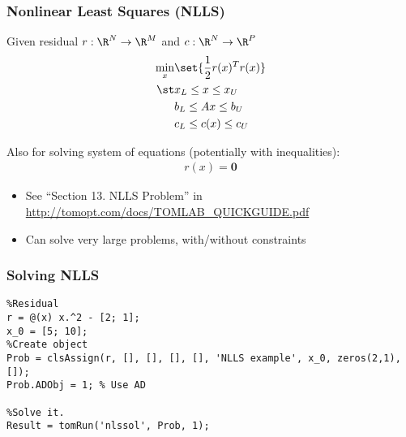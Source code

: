 \documentclass[nofootline]{etk-presentation}
\begin{document}
\begin{frame}[fragile]	\frametitle{Nonlinear Least Squares (NLLS)}
	Given residual $r : \R^N \to \R^M$ and $c : \R^N \to \R^P$
	\begin{align*}
		\min_x &\set{\frac{1}{2}r(x)^T r(x)}\\
		\st & x_L \leq x \leq x_U\\
		& b_L \leq A x \leq b_U\\
		& c_L \leq c(x) \leq c_U
	\end{align*}
	
	Also for solving system of equations (potentially with inequalities):
	\begin{align*}
		r(x) = \mathbf{0}
	\end{align*}
	\begin{itemize}
		\item See ``Section 13. NLLS Problem'' in \url{http://tomopt.com/docs/TOMLAB_QUICKGUIDE.pdf}
		\item Can solve very large problems, with/without constraints
	\end{itemize}
\end{frame}

\begin{frame}[fragile]	\frametitle{Solving NLLS}
	\begin{verbatim}
%Residual
r = @(x) x.^2 - [2; 1];	
x_0 = [5; 10];
%Create object
Prob = clsAssign(r, [], [], [], [], 'NLLS example', x_0, zeros(2,1),[]);
Prob.ADObj = 1; % Use AD

%Solve it.
Result = tomRun('nlssol', Prob, 1);
	\end{verbatim}
\end{frame}	
	
\end{document}
